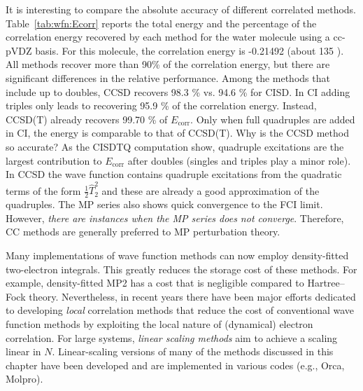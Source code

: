 \documentclass[../Main/notes.tex]{subfiles}
\begin{document}
It is interesting to compare the absolute accuracy of different correlated methods.
Table~\ref{tab:wfn:Ecorr} reports the total energy and the percentage of the correlation energy recovered by each method for the water molecule using a cc-pVDZ basis.
For this molecule, the correlation energy is -0.21492 \Eh (about 135 \kcal).
All methods recover more than 90\% of the correlation energy, but there are significant differences in the relative performance.
Among the methods that include up to doubles, CCSD recovers 98.3 \% vs. 94.6 \% for CISD.
In CI adding triples only leads to recovering 95.9 \% of the correlation energy.
Instead, CCSD(T) already recovers 99.70 \% of $E_\mathrm{corr}$.
Only when full quadruples are added in CI, the energy is comparable to that of CCSD(T).
Why is the CCSD method so accurate? As the CISDTQ computation show, quadruple excitations are the largest contribution to $E_\mathrm{corr}$ after doubles (singles and triples play a minor role).
In CCSD the wave function contains quadruple excitations from the quadratic terms of the form $\frac{1}{2} \hat{T}_2^2$ and these are already a good approximation of the quadruples.
The MP series also shows quick convergence to the FCI limit.
However, \emph{there are instances when the MP series does not converge}. Therefore, CC methods are generally preferred to MP perturbation theory.

Many implementations of wave function methods can now employ density-fitted two-electron integrals.
This greatly reduces the storage cost of these methods.
For example, density-fitted MP2 has a cost that is negligible compared to Hartree--Fock theory.
Nevertheless, in recent years there have been major efforts dedicated to developing \emph{local} correlation methods that reduce the cost of conventional wave function methods by exploiting the local nature of (dynamical) electron correlation.
For large systems, \emph{linear scaling methods} aim to achieve a scaling linear in $N$.
Linear-scaling versions of many of the methods discussed in this chapter have been developed and are implemented in various codes (e.g., Orca, Molpro).
\end{document}
